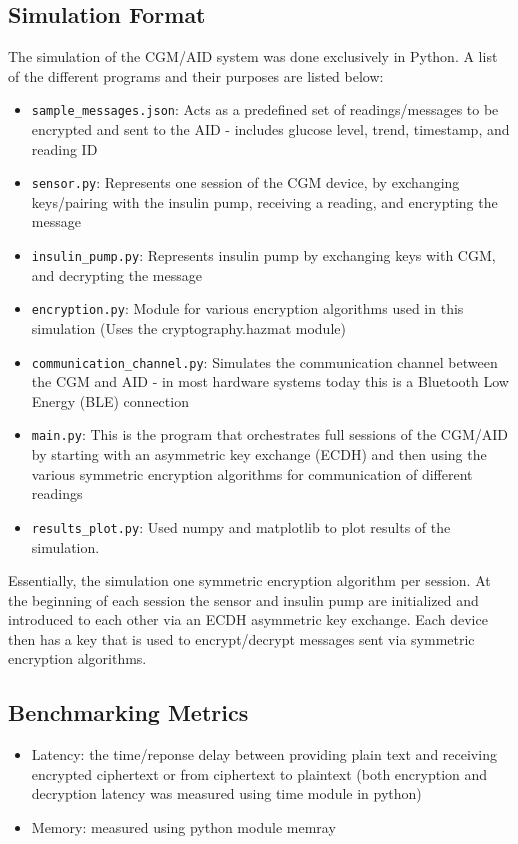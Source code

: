 \documentclass[conference]{IEEEtran}
\begin{document}
\subsection{Simulation Format}\label{AA}
The simulation of the CGM/AID system was done exclusively in Python. A list of the different programs and their purposes are listed below:
\begin{itemize}
\item \texttt{sample\_messages.json}: Acts as a predefined set of readings/messages to be encrypted and sent to the AID - includes glucose level, trend, timestamp, and reading ID
\item \texttt{sensor.py}:  Represents one session of the CGM device, by exchanging keys/pairing with the insulin pump, receiving a reading, and encrypting the message
\item \texttt{insulin\_pump.py}: Represents insulin pump by exchanging keys with CGM, and decrypting the message
\item \texttt{encryption.py}: Module for various encryption algorithms used in this simulation (Uses the cryptography.hazmat module)
\item \texttt{communication\_channel.py}: Simulates the communication channel between the CGM and AID - in most hardware systems today this is a Bluetooth Low Energy (BLE) connection 
\item \texttt{main.py}: This is the program that orchestrates full sessions of the CGM/AID by starting with an asymmetric key exchange (ECDH) and then using the various symmetric encryption algorithms for communication of different readings
\item \texttt{results\_plot.py}: Used numpy and matplotlib to plot results of the simulation.
\end{itemize}
\vspace{.2cm}
Essentially, the simulation one symmetric encryption algorithm per session. At the beginning of each session the sensor and insulin pump are initialized and introduced to each other via an ECDH asymmetric key exchange. Each device then has a key that is used to encrypt/decrypt messages sent via symmetric encryption algorithms.
\subsection{Benchmarking Metrics}
\begin{itemize}
    \item Latency: the time/reponse delay between providing plain text and receiving encrypted ciphertext or from ciphertext to plaintext (both encryption and decryption latency was measured using time module in python)
    \item Memory: measured using python module memray
\end{itemize}
\end{document}

